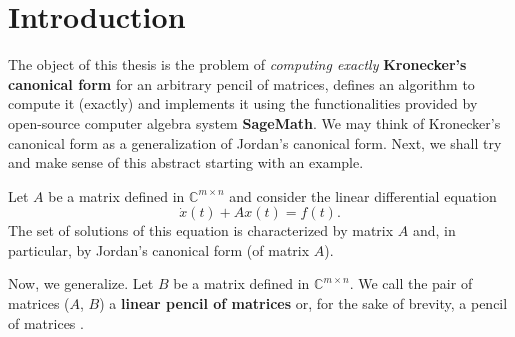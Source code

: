 \section{Introduction}
The object of this thesis is the problem of \textit{computing exactly} \textbf{Kronecker's canonical form}
\cite{kronecker1890} for an arbitrary pencil of matrices, defines an algorithm \linebreak to compute it
(exactly) and implements it using the functionalities provided by open-source computer algebra system
\textbf{SageMath}\cite{sage}. We may think of Kronecker's canonical form as a generalization of Jordan's
canonical form. Next, we shall try and make sense of this abstract starting with an example.

Let $A$ be a matrix defined in $\mathbb{C}^{m \times n}$ and consider the linear differential equation
\[
    \dot{x}(t) + Ax(t) = f(t).
\]
The set of solutions of this equation is characterized by matrix $A$ and, in particular, by Jordan's canonical form
(of matrix $A$).

Now, we generalize. Let $B$ be a matrix defined in $\mathbb{C}^{m \times n}$. We call the pair of matrices ($A$, $B$)
a \textbf{linear pencil of matrices} or, for the sake of brevity,
a pencil of matrices \cite{ikramov}.

